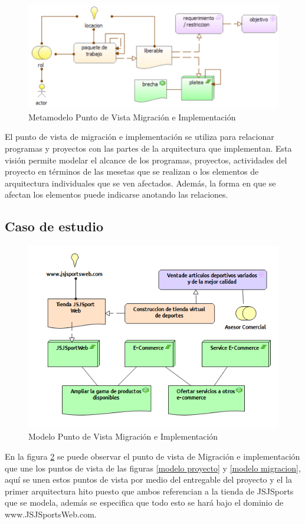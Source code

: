 \begin{figure}[th!]
	\centering
	\includegraphics[width=0.7\linewidth]{arquitectura/imagenes/modeloMigracionImplementacion}
	\caption{Metamodelo Punto de Vista Migración e Implementación}
	\label{metamodelo migracion e implementacion}
\end{figure}
El punto de vista de migración e implementación se utiliza para relacionar programas y proyectos con las partes de la arquitectura que implementan. Esta visión permite modelar el alcance de los programas, proyectos, actividades del proyecto en términos de las mesetas que se realizan o los elementos de arquitectura individuales que se ven afectados. Además, la forma en que se afectan los elementos puede indicarse anotando las relaciones.
\subsection{Caso de estudio}

\begin{figure}[th!]
	\centering
	\includegraphics[width=0.8\linewidth]{arquitectura/imagenes/PuntoVistaMigracionImplementacion}
	\caption{Modelo Punto de Vista Migración e Implementación}
	\label{Modelo migracion e implementacion}
\end{figure}

En la figura \ref{Modelo migracion e implementacion} se puede observar el punto de vista de Migración e implementación que une los puntos de vista de las figuras  \ref{modelo proyecto} y \ref{modelo migracion}, aquí se unen estos puntos de vista por medio del entregable del proyecto y el la primer arquitectura hito puesto que ambos referencian a la tienda de JSJSports que se modela, además se especifica que todo esto se hará bajo el dominio de www.JSJSportsWeb.com.
\newpage

